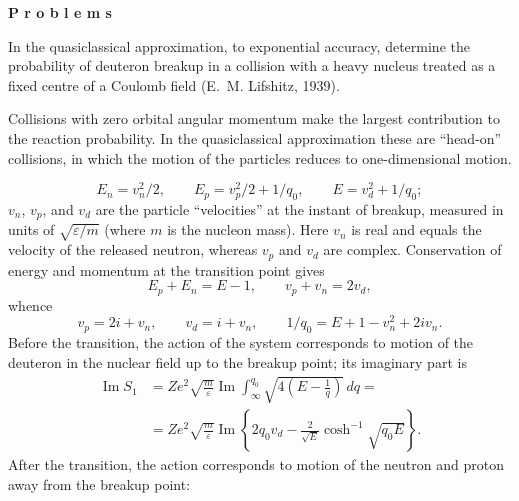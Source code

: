 \begin{center}\textbf{P r o b l e m s}\end{center}

 In the quasiclassical approximation, to exponential
accuracy, determine the probability of deuteron breakup in a collision with a
heavy nucleus treated as a fixed centre of a Coulomb field (E.~M. Lifshitz,
1939).

\SolutionHeading Collisions with zero orbital angular momentum
make the largest contribution to the reaction probability. In the
quasiclassical approximation these are ``head-on'' collisions, in which the
motion of the particles reduces to one-dimensional motion.




\begin{equation}
 E_n=v_n^2/2,\qquad E_p=v_p^2/2+1/q_0,\qquad E=v_d^2+1/q_0;
 \tag{1}
\end{equation}
$v_n$, $v_p$, and $v_d$ are the particle ``velocities'' at the instant of
breakup, measured in units of $\sqrt{\varepsilon/m}$ (where $m$ is the nucleon
mass). Here $v_n$ is real and equals the velocity of the released neutron,
whereas $v_p$ and $v_d$ are complex. Conservation of energy and momentum at
the transition point gives
\begin{equation}
 E_p+E_n=E-1,\qquad v_p+v_n=2v_d,
 \tag{2}
\end{equation}
whence
\[
 v_p=2i+v_n,\qquad v_d=i+v_n,\qquad
 1/q_0=E+1-v_n^2+2iv_n.
\]
Before the transition, the action of the system corresponds to motion of the
deuteron in the nuclear field up to the breakup point; its imaginary part is
\begin{equation}
 \begin{aligned}
 \operatorname{Im}S_1
 &=Ze^2\sqrt{\frac m\varepsilon}\operatorname{Im}
   \int_\infty^{q_0}\sqrt{4\left(E-\frac1q\right)}\,dq={}\\
 &=Ze^2\sqrt{\frac m\varepsilon}\operatorname{Im}
 \left\{2q_0v_d-\frac2{\sqrt E}\cosh^{-1}\sqrt{q_0E}\right\}.
 \end{aligned}
 \tag{3}
\end{equation}
After the transition, the action corresponds to motion of the neutron and
proton away from the breakup point:

